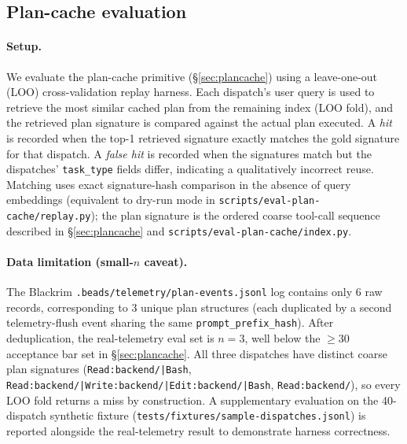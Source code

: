 \subsection{Plan-cache evaluation}
\label{sec:plancache-eval}


\paragraph{Setup.}
We evaluate the plan-cache primitive (§\ref{sec:plancache}) using a
leave-one-out (LOO) cross-validation replay harness.
Each dispatch's user query is used to retrieve the most similar cached plan
from the remaining index (LOO fold), and the retrieved plan signature is
compared against the actual plan executed.
A \emph{hit} is recorded when the top-1 retrieved signature exactly matches the
gold signature for that dispatch.
A \emph{false hit} is recorded when the signatures match but the dispatches'
\texttt{task\_type} fields differ, indicating a qualitatively incorrect reuse.
Matching uses exact signature-hash comparison in the absence of query embeddings
(equivalent to dry-run mode in \texttt{scripts/eval-plan-cache/replay.py});
the plan signature is the ordered coarse tool-call sequence described in
§\ref{sec:plancache} and \texttt{scripts/eval-plan-cache/index.py}.

\paragraph{Data limitation (small-$n$ caveat).}
The Blackrim \texttt{.beads/telemetry/plan-events.jsonl} log contains only
6 raw records, corresponding to 3 unique plan structures (each duplicated by a
second telemetry-flush event sharing the same \texttt{prompt\_prefix\_hash}).
After deduplication, the real-telemetry eval set is \(n=3\), well below the
\(\geq\!30\) acceptance bar set in §\ref{sec:plancache}.
All three dispatches have distinct coarse plan signatures
(\texttt{Read:backend/|Bash},
\texttt{Read:backend/|Write:backend/|Edit:backend/|Bash},
\texttt{Read:backend/}),
so every LOO fold returns a miss by construction.
A supplementary evaluation on the 40-dispatch synthetic fixture
(\texttt{tests/fixtures/sample-dispatches.jsonl}) is reported alongside the
real-telemetry result to demonstrate harness correctness.

